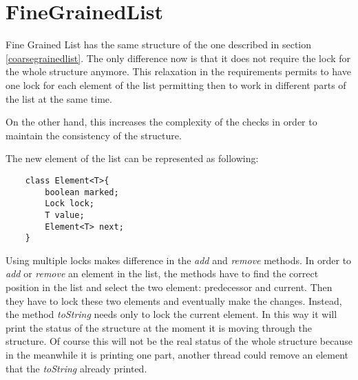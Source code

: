 \section{FineGrainedList}
\label{finegrainedlist}


Fine Grained List has the same structure of the one described in section \ref{coarsegrainedlist}. The only difference now is that it does not require the lock for the whole structure anymore. This relaxation in the requirements permits to have one lock for each element of the list permitting then to work in different parts of the list at the same time. 


On the other hand, this increases the complexity of the checks in order to maintain the consistency of the structure.\newline



The new element of the list can be represented as following:\newline

\begin{lstlisting}
	class Element<T>{
		boolean marked;
		Lock lock;
		T value;
		Element<T> next;
	}
\end{lstlisting}

Using multiple locks makes difference in the \emph{add} and \emph{remove} methods. In order to \emph{add} or \emph{remove} an element in the list, the methods have to find the correct position in the list and select the two element: predecessor and current. Then they have to lock these two elements and eventually make the changes. Instead, the method \emph{toString} needs only to lock the current element. In this way it will print the status of the structure at the moment it is moving through the structure. Of course this will not be the real status of the whole structure because in the meanwhile it is printing one part, another thread could remove an element that the \emph{toString} already printed.\newline


